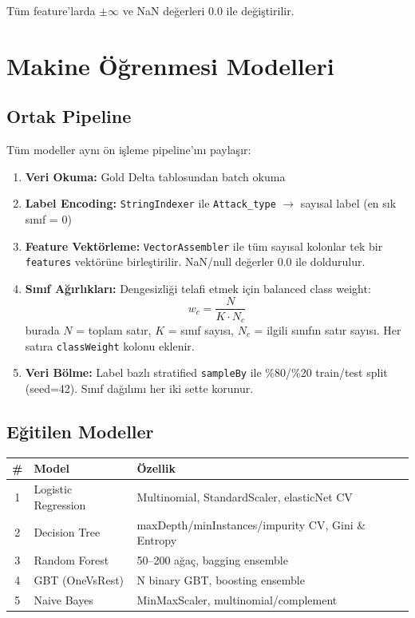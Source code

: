 \documentclass[12pt,a4paper]{article}
\begin{document}
Tüm feature'larda $\pm\infty$ ve NaN değerleri 0.0 ile değiştirilir.

\section{Makine Öğrenmesi Modelleri}
\label{sec:ml}

\subsection{Ortak Pipeline}
Tüm modeller aynı ön işleme pipeline'ını paylaşır:
\begin{enumerate}[noitemsep]
  \item \textbf{Veri Okuma:} Gold Delta tablosundan batch okuma
  \item \textbf{Label Encoding:} \texttt{StringIndexer} ile \texttt{Attack\_type} $\to$ sayısal label (en sık sınıf = 0)
  \item \textbf{Feature Vektörleme:} \texttt{VectorAssembler} ile tüm sayısal kolonlar tek bir \texttt{features} vektörüne birleştirilir. NaN/null değerler 0.0 ile doldurulur.
  \item \textbf{Sınıf Ağırlıkları:} Dengesizliği telafi etmek için balanced class weight:
  $$w_c = \frac{N}{K \cdot N_c}$$
  burada $N$ = toplam satır, $K$ = sınıf sayısı, $N_c$ = ilgili sınıfın satır sayısı. Her satıra \texttt{classWeight} kolonu eklenir.
  \item \textbf{Veri Bölme:} Label bazlı stratified \texttt{sampleBy} ile \%80/\%20 train/test split (seed=42). Sınıf dağılımı her iki sette korunur.
\end{enumerate}

\subsection{Eğitilen Modeller}

\begin{table}[H]\centering
\begin{tabularx}{\textwidth}{clX}
\toprule
\# & Model & Özellik \\
\midrule
1 & Logistic Regression & Multinomial, StandardScaler, elasticNet CV \\
2 & Decision Tree       & maxDepth/minInstances/impurity CV, Gini \& Entropy \\
3 & Random Forest       & 50--200 ağaç, bagging ensemble \\
4 & GBT (OneVsRest)     & N binary GBT, boosting ensemble \\
5 & Naive Bayes         & MinMaxScaler, multinomial/complement \\
\bottomrule
\end{tabularx}
\end{table}
\end{document}
